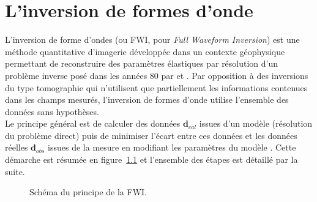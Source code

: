 \chapter{L'inversion de formes d'onde \label{fwi}}
\linenumbers

L'inversion de forme d'ondes (ou FWI, pour \emph{Full Waveform Inversion}) est une méthode quantitative d'imagerie développée dans un contexte géophysique permettant de reconstruire des paramètres élastiques par résolution d'un problème inverse posé dans les années 80 par \cite{lailly} et \cite{tarantola_84}. Par opposition à des inversions du type tomographie qui n'utilisent que partiellement les informations contenues dans les champs mesurés, l'inversion de formes d'onde utilise l'ensemble des données sans hypothèses. \\

Le principe général est de calculer des données $\bm{d}_{cal}$ issues d'un modèle (résolution du problème direct)  puis de minimiser l'écart entre ces données et les données réelles $\bm{d}_{obs}$ issues de la mesure en modifiant les paramètres du modèle \citep{virieux_review}. Cette démarche est résumée en figure~\ref{schema_fwi} et l'ensemble des étapes est détaillé par la suite.\\


\begin{figure}[!h]
	\caption{ Schéma du principe de la FWI.\label{schema_fwi}}
\end{figure}

